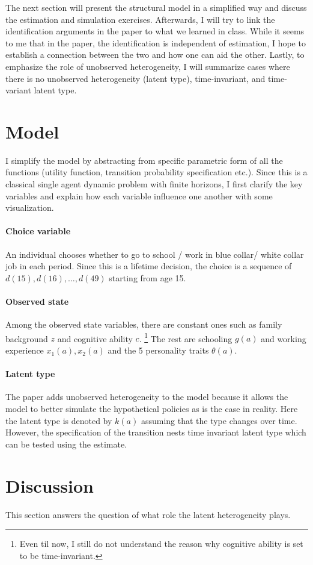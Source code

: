 \documentclass[10pt]{article}
\begin{document}
The next section will present the structural model in a simplified way and
discuss the estimation and simulation exercises. Afterwards, I will try to link
the identification arguments in the paper to what we learned in class. While it
seems to me that in the paper, the identification is independent of estimation,
I hope to establish a connection between the two and how one can aid the other.
Lastly, to emphasize the role of unobserved heterogeneity, I will summarize
cases where there is no unobserved heterogeneity (latent type), time-invariant,
and time-variant latent type.

\section{Model}
I simplify the model by abstracting from specific parametric form of all the
functions (utility function, transition probability specification etc.). Since
this is a classical single agent dynamic problem with finite horizons, I first
clarify the key variables and explain how each variable influence one another
with some visualization.
\paragraph{Choice variable} An individual chooses whether to go to school / work in blue collar/ white
collar job in each period. Since this is a lifetime decision, the choice is a
sequence of $d(15),d(16),\ldots,d(49)$ starting from age 15.
\paragraph{Observed state} Among the observed state variables, there are constant ones such as family
background $z$ and cognitive ability $c$. \footnote{Even til now, I still do
    not understand the reason why cognitive ability is set to be time-invariant.}
The rest are schooling $g(a)$ and working experience $x_1(a),x_2(a)$ and the 5
personality traits $\theta(a)$.
\paragraph{Latent type} The paper adds unobserved heterogeneity to the model because it allows the
model to better simulate the hypothetical policies as is the case in reality.
Here the latent type is denoted by $k(a)$ assuming that the type changes over
time. However, the specification of the transition nests time invariant latent
type which can be tested using the estimate.
\section{Discussion}
This section answers the question of what role the latent heterogeneity plays.

\pagebreak \newpage 
\end{document}
